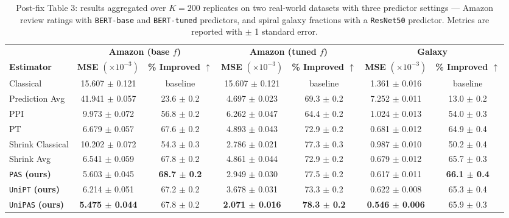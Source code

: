 \begin{table}[H]
    \centering
    \caption{Post-fix Table 3: results aggregated over $K = 200$ replicates on two real-world datasets with three predictor settings --- Amazon review ratings with \texttt{BERT-base} and \texttt{BERT-tuned} predictors, and spiral galaxy fractions with a \texttt{ResNet50} predictor. Metrics are reported with $\pm$ 1 standard error.}
    \label{tbl:postfix_real}
    \vskip 0.05in
    \footnotesize
    \begin{tabular}{lcccccc}
    \toprule
    & \multicolumn{2}{c}{\textbf{Amazon (base $f$)}} & \multicolumn{2}{c}{\textbf{Amazon (tuned $f$)}} & \multicolumn{2}{c}{\textbf{Galaxy}} \\
    \cmidrule(lr){2-3} \cmidrule(lr){4-5} \cmidrule(lr){6-7}
    \textbf{Estimator} & \textbf{MSE} \( (\times 10^{-3}) \) & \textbf{\% Improved $\uparrow$} & \textbf{MSE} \( (\times 10^{-3}) \) & \textbf{\% Improved $\uparrow$} & \textbf{MSE} \( (\times 10^{-3}) \) & \textbf{\% Improved $\uparrow$} \\
    \midrule
    Classical & 15.607 $\pm$ 0.121 & baseline & 15.607 $\pm$ 0.121 & baseline & 1.361 $\pm$ 0.016 & baseline \\
    Prediction Avg & 41.941 $\pm$ 0.057 & 23.6 $\pm$ 0.2 & 4.697 $\pm$ 0.023 & 69.3 $\pm$ 0.2 & 7.252 $\pm$ 0.011 & 13.0 $\pm$ 0.2 \\
    PPI & 9.973 $\pm$ 0.072 & 56.8 $\pm$ 0.2 & 6.262 $\pm$ 0.047 & 64.4 $\pm$ 0.2 & 1.024 $\pm$ 0.013 & 54.0 $\pm$ 0.3 \\
    PT & 6.679 $\pm$ 0.057 & 67.6 $\pm$ 0.2 & 4.893 $\pm$ 0.043 & 72.9 $\pm$ 0.2 & 0.681 $\pm$ 0.012 & 64.9 $\pm$ 0.4 \\
    Shrink Classical & 10.202 $\pm$ 0.072 & 54.3 $\pm$ 0.3 & 2.786 $\pm$ 0.021 & 77.3 $\pm$ 0.3 & 0.987 $\pm$ 0.010 & 50.2 $\pm$ 0.4 \\
    Shrink Avg & 6.541 $\pm$ 0.059 & 67.8 $\pm$ 0.2 & 4.861 $\pm$ 0.044 & 72.9 $\pm$ 0.2 & 0.679 $\pm$ 0.012 & 65.7 $\pm$ 0.3 \\
    \texttt{PAS} \textbf{(ours)} & 5.603 $\pm$ 0.045 & \textbf{68.7 $\pm$ 0.2} & 2.949 $\pm$ 0.030 & 77.5 $\pm$ 0.2 & 0.617 $\pm$ 0.011 & \textbf{66.1 $\pm$ 0.4} \\
    \texttt{UniPT} \textbf{(ours)} & 6.214 $\pm$ 0.051 & 67.2 $\pm$ 0.2 & 3.678 $\pm$ 0.031 & 73.3 $\pm$ 0.2 & 0.622 $\pm$ 0.008 & 65.3 $\pm$ 0.4 \\
    \texttt{UniPAS} \textbf{(ours)} & \textbf{5.475 $\pm$ 0.044} & 67.8 $\pm$ 0.2 & \textbf{2.071 $\pm$ 0.016} & \textbf{78.3 $\pm$ 0.2} & \textbf{0.546 $\pm$ 0.006} & 65.9 $\pm$ 0.3 \\
    \bottomrule
    \end{tabular}
\end{table}

